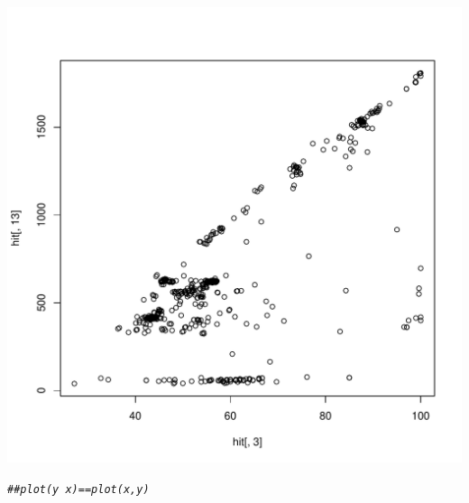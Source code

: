 \documentclass{config/apuntes}\usepackage[]{graphicx}\usepackage[]{xcolor}
\makeatletter
\def\maxwidth{ %
  \ifdim\Gin@nat@width>\linewidth
    \linewidth
  \else
    \Gin@nat@width
  \fi
}
\newcommand{\hlcom}[1]{\textcolor[rgb]{0.678,0.584,0.686}{\textit{#1}}}%
\newenvironment{kframe}{%
 \def\at@end@of@kframe{}%
 \ifinner\ifhmode%
  \def\at@end@of@kframe{\end{minipage}}%
  \begin{minipage}{\columnwidth}%
 \fi\fi%
 \def\FrameCommand##1{\hskip\@totalleftmargin \hskip-\fboxsep
 \colorbox{shadecolor}{##1}\hskip-\fboxsep
     \hskip-\linewidth \hskip-\@totalleftmargin \hskip\columnwidth}%
 \MakeFramed {\advance\hsize-\width
   \@totalleftmargin\z@ \linewidth\hsize
   \@setminipage}}%
 {\par\unskip\endMakeFramed%
 \at@end@of@kframe}
\newenvironment{knitrout}{}{} %
\makeatother
\begin{document}
\begin{knitrout}
\includegraphics[width=\maxwidth]{figure/unnamed-chunk-73-2} 
\begin{kframe}\begin{alltt}
\hlcom{## plot(y ~ x) == plot(x, y)}
\end{alltt}
\end{kframe}
\end{knitrout}
\end{document}
